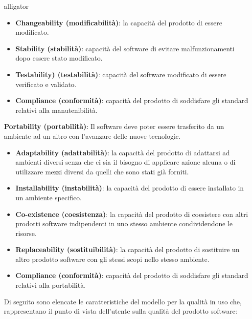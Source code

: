 \begin{labeling}{alligator}
\begin{itemize}
		\item \textbf{Changeability (modificabilità)}: la capacità del prodotto di essere modificato.
		
		\item \textbf{Stability (stabilità)}: capacità del software di evitare malfunzionamenti dopo essere stato modificato.
		
		\item \textbf{Testability) (testabilità)}: capacità del software modificato di essere verificato e validato.
		
		\item \textbf{Compliance (conformità)}: capacità del prodotto di soddisfare gli standard relativi alla manutenibilità.
	\end{itemize}
	
	\item \textbf{Portability (portabilità)}: Il software deve poter essere trasferito da un ambiente ad un altro con l'avanzare delle nuove tecnologie.
	\begin{itemize}
		\item \textbf{Adaptability (adattabilità)}: la capacità del prodotto di adattarsi ad ambienti diversi senza che ci sia il bisogno di applicare azione alcuna o di utilizzare mezzi diversi da quelli che sono stati già forniti. 
		
		\item \textbf{Installability (instabilità)}: la capacità del prodotto di essere installato in un ambiente specifico.
		
		\item \textbf{Co-existence (coesistenza)}: la capacità del prodotto di coesistere con altri prodotti software indipendenti in uno stesso ambiente condividendone le risorse.
		
		\item \textbf{Replaceability (sostituibilità)}: la capacità del prodotto di sostituire un altro prodotto software con gli stessi scopi nello stesso ambiente. 
		
		\item \textbf{Compliance (conformità)}: capacità del prodotto di soddisfare gli standard relativi alla portabilità.
	\end{itemize}
\end{labeling}

Di seguito sono elencate le caratteristiche del modello per la qualità in uso che, rappresentano il punto di vista dell'utente sulla qualità del prodotto software:

